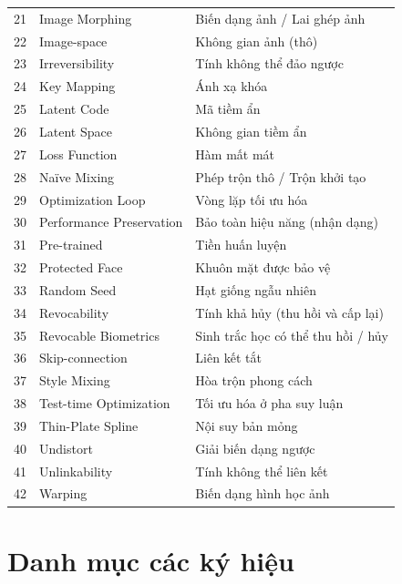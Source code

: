 \documentclass[oneside,a4paper,12pt]{extarticle}
\begin{document}
{\begin{longtable}{r >{\raggedright\arraybackslash}p{5.2cm} >{\raggedright\arraybackslash}p{8.0cm}}
21 & Image Morphing & Biến dạng ảnh / Lai ghép ảnh \\
22 & Image-space & Không gian ảnh (thô) \\
23 & Irreversibility & Tính không thể đảo ngược \\
24 & Key Mapping & Ánh xạ khóa \\
25 & Latent Code & Mã tiềm ẩn \\
26 & Latent Space & Không gian tiềm ẩn \\
27 & Loss Function & Hàm mất mát \\
28 & Na\"ive Mixing & Phép trộn thô / Trộn khởi tạo \\
29 & Optimization Loop & Vòng lặp tối ưu hóa \\
30 & Performance Preservation & Bảo toàn hiệu năng (nhận dạng) \\
31 & Pre-trained & Tiền huấn luyện \\
32 & Protected Face & Khuôn mặt được bảo vệ \\
33 & Random Seed & Hạt giống ngẫu nhiên \\
34 & Revocability & Tính khả hủy (thu hồi và cấp lại) \\
35 & Revocable Biometrics & Sinh trắc học có thể thu hồi / hủy \\
36 & Skip-connection & Liên kết tắt \\
37 & Style Mixing & Hòa trộn phong cách \\
38 & Test-time Optimization & Tối ưu hóa ở pha suy luận \\
39 & Thin-Plate Spline & Nội suy bản mỏng \\
40 & Undistort & Giải biến dạng ngược \\
41 & Unlinkability & Tính không thể liên kết \\
42 & Warping & Biến dạng hình học ảnh \\
\end{longtable}
\addtocounter{table}{-1}
}

\clearpage
{}
\section*{Danh mục các ký hiệu}
\end{document}
